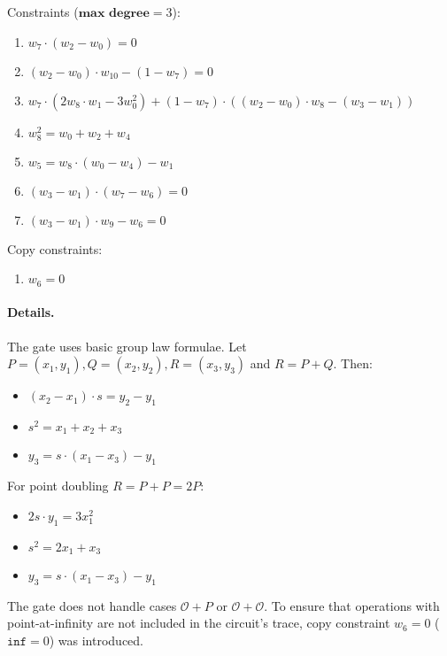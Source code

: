 Constraints ($\textbf{max degree} = 3$):
\begin{enumerate}
	 \item $w_7 \cdot (w_2 - w_0) = 0$
    \item $(w_2 - w_0) \cdot w_{10} - (1 - w_7) = 0$
    \item $w_7 \cdot (2w_8 \cdot w_1 - 3w_0^2) + (1 - w_7) \cdot ((w_2 - w_0) \cdot w_8 - (w_3 - w_1))$
    \item $w_8^2 = w_0 + w_2 + w_4$
    \item $w_5 = w_8 \cdot (w_0 - w_4) - w_1$
    \item $(w_3 - w_1) \cdot (w_7 - w_6) = 0$
    \item $(w_3 - w_1) \cdot w_9 - w_6 = 0$
\end{enumerate}

Copy constraints:
\begin{enumerate}
	\item $w_6 = 0$
\end{enumerate}

\paragraph{Details.}

The gate uses basic group law formulae. 
Let $P = (x_1, y_1), Q = (x_2, y_2), R = (x_3, y_3)$ and $R = P + Q$. Then: 
\begin{itemize}
    \item $(x_2 - x_1) \cdot s = y_2 - y_1$
    \item $s^2 = x_1 + x_2 + x_3$
    \item $y_3 = s \cdot (x_1 - x_3) - y_1$
\end{itemize}
For point doubling $R = P + P = 2P$:
\begin{itemize}
    \item $2s \cdot y_1 = 3x_1^2$
    \item $s^2 = 2x_1 + x_3$
    \item $y_3 = s \cdot (x_1 - x_3) - y_1$
\end{itemize}

The gate does not handle cases $\mathcal{O} + P$ or $\mathcal{O} + \mathcal{O}$.
To ensure that operations with point-at-infinity are not included in the circuit's trace, copy constraint $w_6 = 0$ ($\texttt{inf} = 0$) was introduced. 

